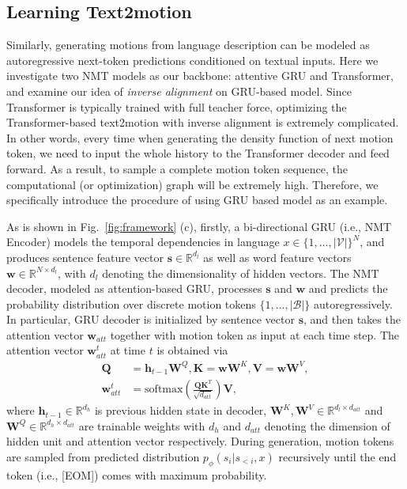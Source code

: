 \documentclass[runningheads]{llncs}
\newcommand{\beforesubsection}{\vspace{-2mm}}
\newcommand{\aftersubsection}{\vspace{-2mm}}
\begin{document}
\beforesubsection
\subsection{Learning Text2motion}
\aftersubsection
\label{app:text-to-motion}

Similarly, generating motions from language description can be modeled as autoregressive next-token predictions conditioned on textual inputs. Here we investigate two NMT models as our backbone: attentive GRU and Transformer, and examine our idea of \textit{inverse alignment} on GRU-based model. Since Transformer is typically trained with full teacher force, optimizing the Transformer-based text2motion with inverse alignment is extremely complicated. In other words, every time when generating the density function of next motion token, we need to input the whole history to the Transformer decoder and feed forward. As a result, to sample a complete motion token sequence, the computational (or optimization) graph will be extremely high. Therefore, we specifically introduce the procedure of using GRU based model as an example.

As is shown in Fig.~\ref{fig:framework} (c), firstly, a bi-directional GRU (i.e., NMT Encoder) models the temporal dependencies in language $x\in\{1,...,|\mathscr{V}|\}^N$, and produces sentence feature vector $\mathbf{s}\in \mathbb{R}^{d_l}$ as well as word feature vectors $\mathbf{w}\in \mathbb{R}^{N\times d_l}$, with $d_l$ denoting the dimensionality of hidden vectors. The NMT decoder, modeled as attention-based GRU, processes $\mathbf{s}$ and $\mathbf{w}$ and predicts the probability distribution over discrete motion tokens $\{1,...,|\mathscr{B}|\}$ autoregressively. In particular, GRU decoder is initialized by sentence vector $\mathbf{s}$, and then takes the attention vector $\mathbf{w}_{att}$ together with motion token as input at each time step. The attention vector $\mathbf{w}_{att}^t$ at time $t$ is obtained via
\begin{align}
    \mathbf{Q} &= \mathbf{h}_{t-1}\mathbf{W}^Q, \mathbf{K}=\mathbf{w}\mathbf{W}^K, \mathbf{V}=\mathbf{w}\mathbf{W}^V,\\
    \mathbf{w}_{att}^t&=\mathrm{softmax}\left(\frac{\mathbf{QK}^T}{\sqrt{d_{att}}}\right)\mathbf{V},
\end{align}
where $\mathbf{h}_{t-1}\in \mathbb{R}^{d_h}$ is previous hidden state in decoder, $\mathbf{W}^K, \mathbf{W}^V\in \mathbb{R}^{d_l\times d_{att}}$ and $\mathbf{W}^Q\in \mathbb{R}^{d_h\times d_{att}}$ are trainable weights with $d_h$ and $d_{att}$ denoting the dimension of hidden unit and attention vector respectively. During generation, motion tokens are sampled from predicted distribution $p_\phi(s_i|s_{<i},x)$ recursively until the end token (i.e., [EOM]) comes with maximum probability.
\end{document}
